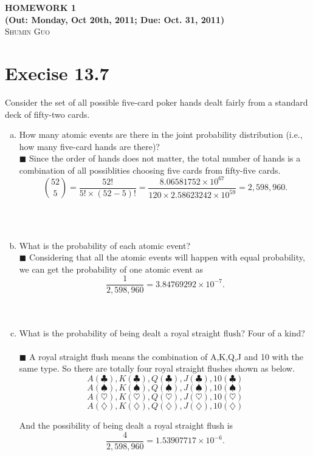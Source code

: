 \documentclass{article}
\newcommand{\solution}[1]{~\\ $\blacksquare$ \sffamily\upshape\selectfont #1
\normalfont ~\\~ }
\begin{document}
\begin{center}
\textbf{\large{
HOMEWORK 1 \\
(Out: Monday, Oct 20th, 2011; Due: Oct. 31, 2011) \\}}
\textsc{\Large{Shumin Guo}}
\end{center}

\section{Execise 13.7}
Consider the set of all possible five-card poker hands dealt fairly
from a standard deck of fifty-two cards.
\begin{enumerate}[a.]
\item How many atomic events are there in the joint probability
  distribution (i.e., how many five-card hands are there)?
  \solution{Since the order of hands does not matter, the total number
  of hands is a combination of all possiblities choosing five cards
  from fifty-five cards. 
  \[ {52 \choose 5} = \frac{52!}{5!\times (52-5)!} =
  \frac{8.06581752\times 10^{67}}{120\times 2.58623242 \times 10^{59}}
  = 2,598,960. \]
} 
\item What is the probability of each atomic event?
  \solution{Considering that all the atomic events will happen with
    equal probability, we can get the probability of one atomic event
    as \[ \frac{1}{2,598,960}=3.84769292\times 10^{-7}. \]} 
\item What is the probability of being dealt a royal straight flush?
  Four of a kind? 
  \solution{A royal straight flush means the combination of A,K,Q,J
    and 10 with the same type. So there are totally four royal
    straight flushes shown as below. 
    \[ A(\clubsuit), K(\clubsuit), Q(\clubsuit), J(\clubsuit),
    10(\clubsuit) \] 
    \[ A(\spadesuit), K(\spadesuit), Q(\spadesuit), J(\spadesuit),
    10(\spadesuit) \]
    \[ A(\heartsuit), K(\heartsuit), Q(\heartsuit), J(\heartsuit),
    10(\heartsuit) \]
    \[ A(\diamondsuit), K(\diamondsuit), Q(\diamondsuit), J(\diamondsuit),
    10(\diamondsuit) \]
    
    And the possibility of being dealt a royal straight flush is 
    \[ \frac{4}{2,598,960}=1.53907717 \times 10^{-6}. \] 
  }
\end{enumerate}
\end{document}

